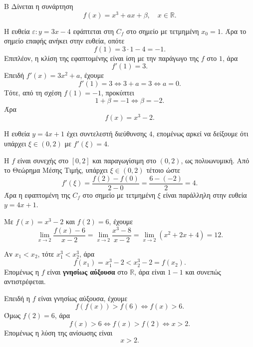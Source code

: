 \begin{thema}{Β}
Δίνεται η συνάρτηση
\[
f(x)=x^3+ax+\beta,\quad x\in\mathbb{R}.
\]

\begin{erwthma}
\item Η ευθεία $\varepsilon:y=3x-4$ εφάπτεται στη $C_f$ στο σημείο με τετμημένη $x_0=1$. Άρα το σημείο επαφής ανήκει στην ευθεία, οπότε
\[
f(1)=3\cdot1-4=-1.
\]
Επιπλέον, η κλίση της εφαπτομένης είναι ίση με την παράγωγο της $f$ στο $1$, άρα
\[
f'(1)=3.
\]
Επειδή $f'(x)=3x^2+a$, έχουμε
\[
f'(1)=3\Leftrightarrow 3+a=3\Leftrightarrow a=0.
\]
Τότε, από τη σχέση $f(1)=-1$, προκύπτει
\[
1+\beta=-1\Leftrightarrow \beta=-2.
\]
Άρα
\[
f(x)=x^3-2.
\]

\item Η ευθεία $y=4x+1$ έχει συντελεστή διεύθυνσης $4$, επομένως αρκεί να δείξουμε ότι υπάρχει $\xi\in(0,2)$ με $f'(\xi)=4$.

Η $f$ είναι συνεχής στο $[0,2]$ και παραγωγίσιμη στο $(0,2)$, ως πολυωνυμική. Από το Θεώρημα Μέσης Τιμής, υπάρχει $\xi\in(0,2)$ τέτοιο ώστε
\[
f'(\xi)=\frac{f(2)-f(0)}{2-0}
=\frac{6-(-2)}{2}=4.
\]
Άρα η εφαπτομένη της $C_f$ στο σημείο με τετμημένη $\xi$ είναι παράλληλη στην ευθεία $y=4x+1$.

\item Με $f(x)=x^3-2$ και $f(2)=6$, έχουμε
\[
\lim_{x\to2}\frac{f(x)-6}{x-2}
=\lim_{x\to2}\frac{x^3-8}{x-2}
=\lim_{x\to2}(x^2+2x+4)=12.
\]

\item Αν $x_1<x_2$, τότε $x_1^3<x_2^3$, άρα
\[
f(x_1)=x_1^3-2<x_2^3-2=f(x_2).
\]
Επομένως η $f$ είναι \textbf{γνησίως αύξουσα} στο $\mathbb{R}$, άρα είναι $1-1$ και συνεπώς αντιστρέφεται.

Επειδή η $f$ είναι γνησίως αύξουσα, έχουμε
\[
f(f(x))>f(6)\Leftrightarrow f(x)>6.
\]
Όμως $f(2)=6$, άρα
\[
f(x)>6\Leftrightarrow f(x)>f(2)\Leftrightarrow x>2.
\]
Επομένως η λύση της ανίσωσης είναι
\[
x>2.
\]
\end{erwthma}
\end{thema}

